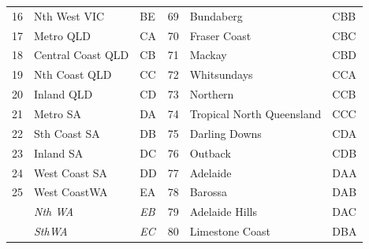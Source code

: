 \documentclass[a4paper,11pt]{article}
\theoremstyle{definition}
\begin{document}
\begin{table}[H]
\begin{tabular}{r l l|r l l}
		16                                   & Nth West VIC            & BE             & 69                                              & Bundaberg                       & CBB            \\
		17                                   & Metro QLD               & CA             & 70                                              & Fraser Coast                    & CBC            \\
		18                                   & Central Coast QLD       & CB             & 71                                              & Mackay                          & CBD            \\
		19                                   & Nth Coast QLD           & CC             & 72                                              & Whitsundays                     & CCA            \\
		20                                   & Inland QLD              & CD             & 73                                              & Northern                        & CCB            \\
		21                                   & Metro SA                & DA             & 74                                              & Tropical North Queensland       & CCC            \\
		22                                   & Sth Coast SA            & DB             & 75                                              & Darling Downs                   & CDA            \\
		23                                   & Inland SA               & DC             & 76                                              & Outback                         & CDB            \\
		24                                   & West Coast SA           & DD             & 77                                              & Adelaide                        & DAA            \\
		25                                   & West CoastWA            & EA             & 78                                              & Barossa                         & DAB            \\
		                                     & \textit{Nth WA}         & \textit{EB}    & 79                                              & Adelaide Hills                  & DAC            \\
		                                     & \textit{SthWA}          & \textit{EC}    & 80                                              & Limestone Coast                 & DBA            \\

\end{tabular}
\end{table}
\end{document}
